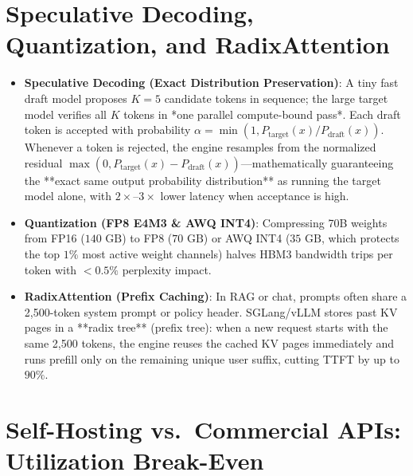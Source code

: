 \section{Speculative Decoding, Quantization, and RadixAttention}

\begin{itemize}[leftmargin=18pt]
  \item \textbf{Speculative Decoding (Exact Distribution Preservation)}: A tiny fast draft model proposes $K=5$ candidate tokens in sequence; the large target model verifies all $K$ tokens in *one parallel compute-bound pass*. Each draft token is accepted with probability $\alpha = \min(1, P_{\text{target}}(x)/P_{\text{draft}}(x))$. Whenever a token is rejected, the engine resamples from the normalized residual $\max(0, P_{\text{target}}(x) - P_{\text{draft}}(x))$---mathematically guaranteeing the **exact same output probability distribution** as running the target model alone, with $2\times$--$3\times$ lower latency when acceptance is high.
  \item \textbf{Quantization (FP8 E4M3 \& AWQ INT4)}: Compressing 70B weights from FP16 ($140\text{ GB}$) to FP8 ($70\text{ GB}$) or AWQ INT4 ($35\text{ GB}$, which protects the top $1\%$ most active weight channels) halves HBM3 bandwidth trips per token with $<0.5\%$ perplexity impact.
  \item \textbf{RadixAttention (Prefix Caching)}: In RAG or chat, prompts often share a 2,500-token system prompt or policy header. SGLang/vLLM stores past KV pages in a **radix tree** (prefix tree): when a new request starts with the same 2,500 tokens, the engine reuses the cached KV pages immediately and runs prefill only on the remaining unique user suffix, cutting TTFT by up to $90\%$.
\end{itemize}

\section{Self-Hosting vs.\ Commercial APIs: Utilization Break-Even}

